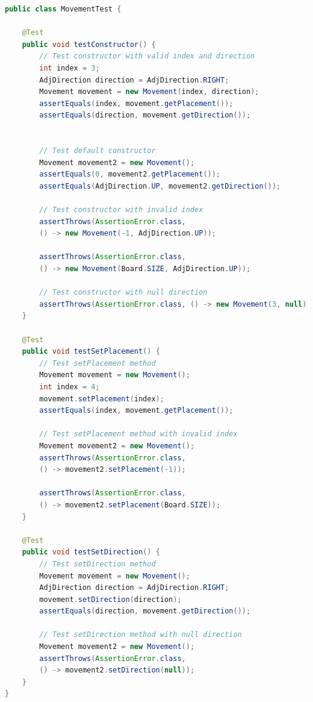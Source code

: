 \documentclass[a4paper,11pt]{article}
\begin{document}
\begin{lstlisting}[language=Java]
public class MovementTest {

    @Test
    public void testConstructor() {
        // Test constructor with valid index and direction
        int index = 3;
        AdjDirection direction = AdjDirection.RIGHT;
        Movement movement = new Movement(index, direction);
        assertEquals(index, movement.getPlacement());
        assertEquals(direction, movement.getDirection());


        // Test default constructor
        Movement movement2 = new Movement();
        assertEquals(0, movement2.getPlacement());
        assertEquals(AdjDirection.UP, movement2.getDirection());

        // Test constructor with invalid index
        assertThrows(AssertionError.class,
        () -> new Movement(-1, AdjDirection.UP));
        
        assertThrows(AssertionError.class,
        () -> new Movement(Board.SIZE, AdjDirection.UP));

        // Test constructor with null direction
        assertThrows(AssertionError.class, () -> new Movement(3, null));
    }

    @Test
    public void testSetPlacement() {
        // Test setPlacement method
        Movement movement = new Movement();
        int index = 4;
        movement.setPlacement(index);
        assertEquals(index, movement.getPlacement());

        // Test setPlacement method with invalid index
        Movement movement2 = new Movement();
        assertThrows(AssertionError.class,
        () -> movement2.setPlacement(-1));
        
        assertThrows(AssertionError.class,
        () -> movement2.setPlacement(Board.SIZE));
    }

    @Test
    public void testSetDirection() {
        // Test setDirection method
        Movement movement = new Movement();
        AdjDirection direction = AdjDirection.RIGHT;
        movement.setDirection(direction);
        assertEquals(direction, movement.getDirection());

        // Test setDirection method with null direction
        Movement movement2 = new Movement();
        assertThrows(AssertionError.class,
        () -> movement2.setDirection(null));
    }
}


\end{lstlisting}


\newpage
\end{document}
